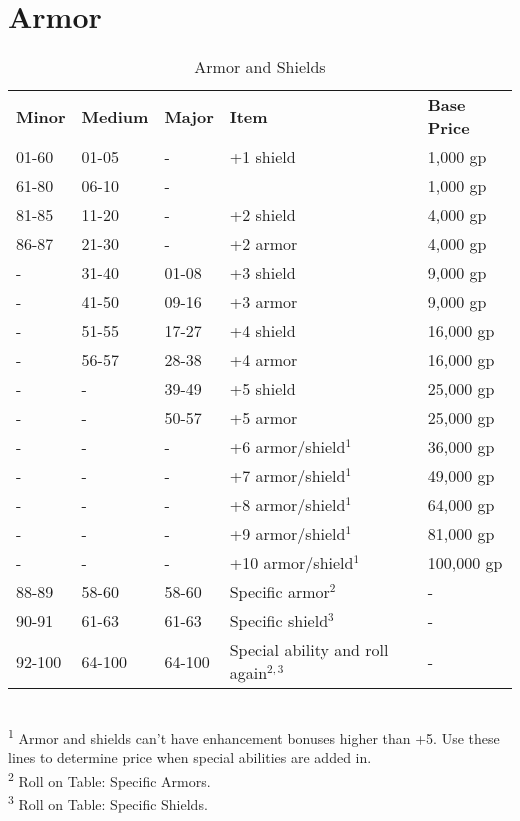 \section{Armor}

\label{f0}
\begin{table}[]
\sffamily
\caption{Armor and Shields}
\begin{tabular}{lllll}
\textbf{Minor} & \textbf{Medium} & \textbf{Major} & \textbf{Item} & \textbf{Base Price}\\
01-60 & 01-05 & - & +1 shield & 1,000 gp\\
61-80 & 06-10 & - &   & 1,000 gp\\
81-85 & 11-20 & -  & +2 shield  & 4,000 gp\\
86-87 & 21-30 & -  & +2 armor  & 4,000 gp\\
- & 31-40 & 01-08  & +3 shield  & 9,000 gp\\
- & 41-50 & 09-16  & +3 armor  & 9,000 gp\\
- & 51-55 & 17-27  & +4 shield  & 16,000 gp\\
- & 56-57 & 28-38  & +4 armor  & 16,000 gp\\
- & - & 39-49  & +5 shield  & 25,000 gp\\
- & - & 50-57  & +5 armor  & 25,000 gp\\
- & - & -  & +6 armor/shield\(^{1}\) & 36,000 gp\\
- & - & -  & +7 armor/shield\(^{1}\) & 49,000 gp\\
- & - & -  & +8 armor/shield\(^{1}\) & 64,000 gp\\
- & - & -  & +9 armor/shield\(^{1}\) & 81,000 gp\\
- & - & -  & +10 armor/shield\(^{1}\) & 100,000 gp\\
88-89 & 58-60  & 58-60  & Specific armor\(^{2}\) & -\\
90-91 & 61-63 &  61-63  & Specific shield\(^{3}\) & -\\
92-100 & 64-100  & 64-100  & Special ability  and roll again\(^{2,3}\) & -\\
\end{tabular}\\
\textsuperscript{1} Armor and shields can't have enhancement bonuses higher than +5. Use these lines to determine price when special abilities are added in.\\
\textsuperscript{2} Roll on Table: Specific Armors. \\
\textsuperscript{3} Roll on Table: Specific Shields.\\
\end{table}


